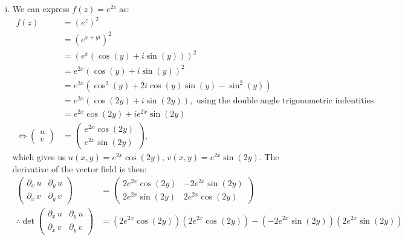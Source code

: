 \documentclass[a4paper, titlepage, DIV=14]{scrartcl}
\begin{document}
\begin{enumerate}[(i)]
        \item We can express $f(z) = e^{2z}$ as:
        \begin{align*}
            f(z) &= (e^{z})^{2} \\
                &= (e^{x+yi})^{2} \\
                &= (e^{x}(\cos(y) + i\sin(y)))^{2} \\
                &= e^{2x}(\cos(y) + i\sin(y))^{2} \\
                &= e^{2x}(\cos^{2}(y) + 2i\cos(y)\sin(y) - \sin^{2}(y)) \\
                &= e^{2x}(\cos(2y) + i\sin(2y)), \text{ using the double angle trigonometric indentities} \\
                &= e^{2x}\cos(2y) + ie^{2x}\sin(2y) \\
            \Leftrightarrow 
            \begin{pmatrix}
                u \\
                v
            \end{pmatrix}
            &= 
            \begin{pmatrix}
                e^{2x}\cos(2y) \\
                e^{2x}\sin(2y)
            \end{pmatrix}, 
        \end{align*}which gives us $u(x,y) = e^{2x}\cos(2y), \, v(x,y) = e^{2x}\sin(2y)$. The derivative of the
        vector field is then:
        \begin{align*}
            \begin{pmatrix}
                \partial_{x} \, u & \partial_{y} \, u \\
                \partial_{x} \, v & \partial_{y} \, v                
            \end{pmatrix} &=
            \begin{pmatrix}
                2e^{2x}\cos(2y) & -2e^{2x}\sin(2y) \\
                2e^{2x}\sin(2y) & 2e^{2x}\cos(2y)
            \end{pmatrix} \\
            \therefore \det 
            \begin{pmatrix}
                \partial_{x} \, u & \partial_{y} \, u \\
                \partial_{x} \, v & \partial_{y} \, v                
            \end{pmatrix} 
            &= (2e^{2x}\cos(2y))(2e^{2x}\cos(2y)) - (-2e^{2x}\sin(2y))(2e^{2x}\sin(2y)) \\

\end{align*}
\end{enumerate}
\end{document}
